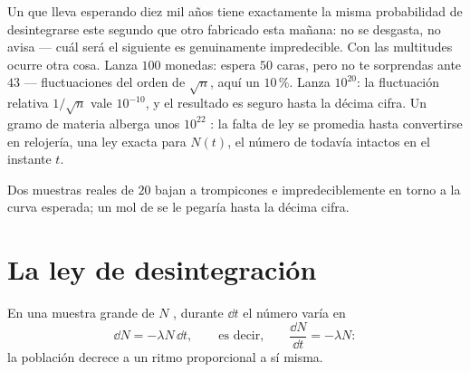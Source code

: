 \begin{remark}\label{rem:g12:radioactive-decay:crowds}
Un  que lleva esperando diez mil años tiene exactamente la misma probabilidad de
desintegrarse este segundo que otro fabricado esta mañana: no se desgasta, no avisa
--- cuál será el siguiente es genuinamente impredecible. Con las multitudes ocurre
otra cosa. Lanza $100$ monedas: espera $50$ caras, pero no te sorprendas ante $43$ ---
fluctuaciones del orden de $\sqrt n$, aquí un $10\,\%$. Lanza $10^{20}$: la
fluctuación relativa $1/\sqrt n$ vale $10^{-10}$, y el resultado es seguro hasta la
décima cifra. Un gramo de materia alberga unos $10^{22}$ : la falta de ley se
promedia hasta convertirse en relojería, una ley exacta para $N(t)$, el número de
 todavía intactos en el instante $t$.
\end{remark}

\begin{omfigure}

{\small Dos muestras reales de $20$  bajan a trompicones e impredeciblemente en
torno a la curva esperada; un mol de  se le pegaría hasta la décima cifra.}
\end{omfigure}

\section{La ley de desintegración}

\begin{proposition}\label{prop:g12:radioactive-decay:ode}
En una muestra grande de $N$ , durante $\dd t$ el número varía en
\[
\dd N = -\lambda N\,\dd t, \qquad\text{es decir,}\qquad \frac{\dd N}{\dd t} = -\lambda N :
\]
la población decrece a un ritmo proporcional a sí misma.
\end{proposition}

